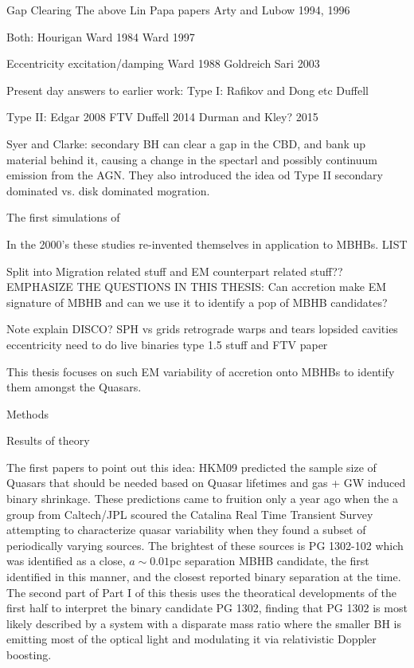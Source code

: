 	Gap Clearing 
		The above Lin Papa papers
		Arty and Lubow 1994, 1996
	
	Both:
	Hourigan Ward 1984
	Ward 1997

	Eccentricity excitation/damping
	Ward 1988
	Goldreich Sari 2003

Present day answers to earlier work:
Type I:
Rafikov and Dong etc
Duffell

Type II:
Edgar 2008
FTV Duffell 2014
Durman and Kley? 2015

Syer and Clarke: secondary BH can clear a gap in the CBD, and bank up material behind it, causing a change in the spectarl and possibly continuum emission from the AGN. They also introduced the idea od Type II secondary dominated vs. disk dominated mogration.

The first simulations of \citep{Artymowicz:1991} 

In the 2000's these studies re-invented themselves in application to MBHBs. LIST

Split into Migration related stuff and EM counterpart related stuff??
EMPHASIZE THE QUESTIONS IN THIS THESIS: Can accretion make EM signature of MBHB and can we use it to identify a pop of MBHB candidates?

Note
explain DISCO?
SPH vs grids
retrograde
warps and tears
lopsided cavities
eccentricity
need to do live binaries type 1.5 stuff and FTV paper





This thesis focuses on such EM variability of accretion onto MBHBs to identify
them amongst the Quasars.

Methods

Results of theory

The first papers to point out this idea: HKM09 predicted the sample size of
Quasars that should be needed based on Quasar lifetimes and gas + GW induced
binary shrinkage. These predictions came to fruition only a year ago when the
a group from Caltech/JPL scoured the Catalina Real Time Transient Survey
\citep{CRTS refs} attempting to characterize quasar variability when they
found a subset of periodically varying sources. The brightest of these sources
is PG 1302-102 which was identified as a close, $a \sim 0.01$pc separation
MBHB candidate, the first identified in this manner, and the closest reported
binary separation at the time. The second part of Part I of this thesis uses
the theoratical developments of the first half to interpret the binary
candidate PG 1302, finding that PG 1302 is most likely described by a system
with a disparate mass ratio where the smaller BH is emitting most of the
optical light and modulating it via relativistic Doppler boosting.


